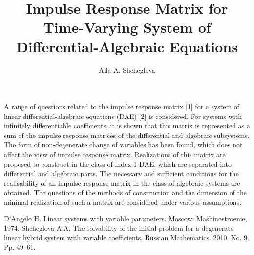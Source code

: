 \title{Impulse Response Matrix for Time-Varying System of Differential-Algebraic Equations}
\author{Alla A. Shcheglova}


\maketitle

\begin{abstract}
\end{abstract}


A range of questions related to the impulse response matrix [1] for a system of linear differential-algebraic equations (DAE) [2] is considered. For systems with infinitely differentiable coefficients, it is shown that this matrix is represented as a sum of the impulse response matrices of the differential and algebraic subsystems.  The form of  non-degenerate change of variables has been found, which does not affect the view of impulse response matrix.  Realizations of this matrix are proposed to construct  in the class of index 1 DAE, which are separated into differential and algebraic parts. The necessary and sufficient conditions for the realisability  of an impulse response matrix in the class of algebraic systems are obtained. The questions of the methods of construction and  the dimension of the minimal realization of such a matrix are considered under various assumptions.

\begin{thebibliography}{9}
{ D'Angelo H.} Linear systems with variable parameters.  Moscow:  Mashinostroenie, 1974.  
{ Shcheglova A.A.} The solvability of the initial problem for a degenerate linear hybrid system with variable coefficients. Russian Mathematics.  2010. No. 9.  Pp. 49--61.  
\end{thebibliography}
